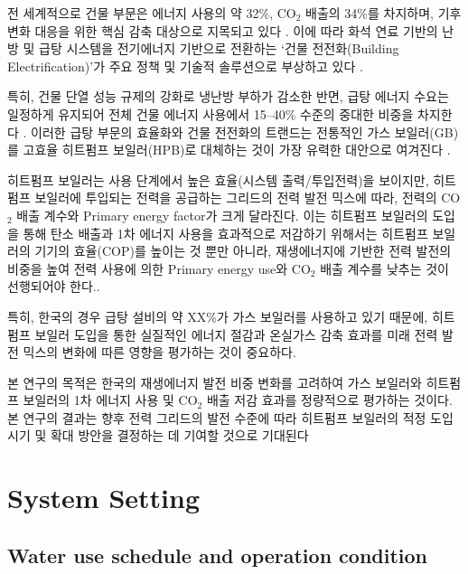 \documentclass[final,5p,times,twocolumn,authoryear]{elsarticle}
\begin{document}

전 세계적으로 건물 부문은 에너지 사용의 약 32\%, CO$_2$ 배출의 34\%를 차지하며,
기후 변화 대응을 위한 핵심 감축 대상으로 지목되고 있다 \cite{unep2024global}.
이에 따라 화석 연료 기반의 난방 및 급탕 시스템을 전기에너지 기반으로 전환하는
`건물 전전화(Building Electrification)'가 주요 정책 및 기술적 솔루션으로 부상하고 있다 \cite{irena2020renewable}.

특히, 건물 단열 성능 규제의 강화로 냉난방 부하가 감소한 반면, 급탕 에너지 수요는 일정하게 유지되어
전체 건물 에너지 사용에서 15--40\% 수준의 중대한 비중을 차지한다 \cite{ref3, ref4}.
이러한 급탕 부문의 효율화와 건물 전전화의 트랜드는 전통적인 가스 보일러(GB)를
고효율 히트펌프 보일러(HPB)로 대체하는 것이 가장 유력한 대안으로 여겨진다 \cite{ref3, ref5}.

히트펌프 보일러는 사용 단계에서 높은 효율(시스템 출력/투입전력)을 보이지만, 히트펌프 보일러에 투입되는 전력을 공급하는 그리드의 전력 발전 믹스에 따라,
전력의 CO$_2$ 배출 계수와  Primary energy factor가 크게 달라진다. 
이는 히트펌프 보일러의 도입을 통해 탄소 배출과 1차 에너지 사용을 효과적으로 저감하기 위해서는
히트펌프 보일러의 기기의 효율(COP)를 높이는 것 뿐만 아니라, 재생에너지에 기반한 전력 발전의 비중을 높여 전력 사용에 의한
Primary energy use와 CO$_2$ 배출 계수를 낮추는 것이 선행되어야 한다.\cite{irena2020renewable}.

특히, 한국의 경우 급탕 설비의 약 XX\%가 가스 보일러를 사용하고 있기 때문에\cite{},
히트펌프 보일러 도입을 통한 실질적인 에너지 절감과 온실가스 감축 효과를
미래 전력 발전 믹스의 변화에 따른 영향을 평가하는 것이 중요하다.  

본 연구의 목적은 한국의 재생에너지 발전 비중 변화를 고려하여 가스 보일러와 히트펌프 보일러의
1차 에너지 사용 및 CO$_2$ 배출 저감 효과를 정량적으로 평가하는 것이다.
본 연구의 결과는 향후 전력 그리드의 발전 수준에 따라 히트펌프 보일러의
적정 도입 시기 및 확대 방안을 결정하는 데 기여할 것으로 기대된다




\section{System Setting}
\label{sec:system}

\subsection{Water use schedule and operation condition}
\end{document}
